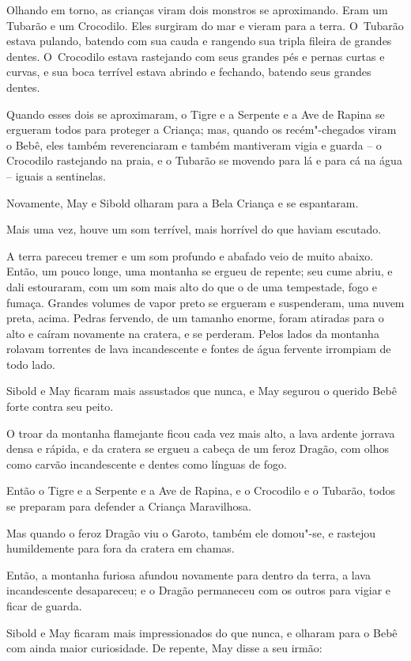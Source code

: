 Olhando em torno, as crianças viram dois monstros se aproximando. Eram
um Tubarão e um Crocodilo. Eles surgiram do mar e vieram para a terra. O~Tubarão estava pulando, batendo com sua cauda e rangendo sua tripla
fileira de grandes dentes. O~Crocodilo estava rastejando com seus
grandes pés e pernas curtas e curvas, e sua boca terrível estava abrindo
e fechando, batendo seus grandes dentes.

Quando esses dois se aproximaram, o Tigre e a Serpente e a Ave de Rapina
se ergueram todos para proteger a Criança; mas, quando os recém"-chegados
viram o Bebê, eles também reverenciaram e também mantiveram vigia e
guarda -- o Crocodilo rastejando na praia, e o Tubarão se movendo para
lá e para cá na água -- iguais a sentinelas.

Novamente, May e Sibold olharam para a Bela Criança e se espantaram.

Mais uma vez, houve um som terrível, mais horrível do que haviam
escutado.

A terra pareceu tremer e um som profundo e abafado veio de muito abaixo.
Então, um pouco longe, uma montanha se ergueu de repente; seu cume
abriu, e dali estouraram, com um som mais alto do que o de uma
tempestade, fogo e fumaça. Grandes volumes de vapor preto se ergueram e
suspenderam, uma nuvem preta, acima. Pedras fervendo, de um tamanho
enorme, foram atiradas para o alto e caíram novamente na cratera, e se
perderam. Pelos lados da montanha rolavam torrentes de lava
incandescente e fontes de água fervente irrompiam de todo lado.

Sibold e May ficaram mais assustados que nunca, e May segurou o querido
Bebê forte contra seu peito.

O troar da montanha flamejante ficou cada vez mais alto, a lava ardente
jorrava densa e rápida, e da cratera se ergueu a cabeça de um feroz
Dragão, com olhos como carvão incandescente e dentes como línguas de
fogo.

Então o Tigre e a Serpente e a Ave de Rapina, e o Crocodilo e o Tubarão,
todos se preparam para defender a Criança Maravilhosa.

Mas quando o feroz Dragão viu o Garoto, também ele domou"-se, e rastejou
humildemente para fora da cratera em chamas.

Então, a montanha furiosa afundou novamente para dentro da terra, a lava
incandescente desapareceu; e o Dragão permaneceu com os outros para
vigiar e ficar de guarda.

Sibold e May ficaram mais impressionados do que nunca, e olharam para o
Bebê com ainda maior curiosidade. De repente, May disse a seu irmão:

